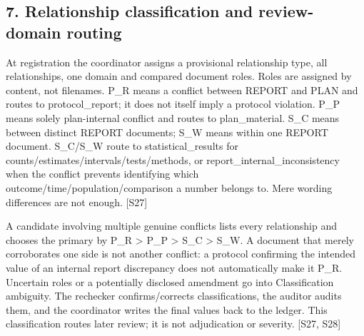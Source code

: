 \documentclass[10pt,a4paper]{article}
\begin{document}
\subsection*{7.\allowbreak{} Relationship classification and review-\allowbreak{}domain routing}
At registration the coordinator assigns a provisional relationship type, all relationships, one domain and compared document roles.\allowbreak{} Roles are assigned by content, not filenames.\allowbreak{} P\_\allowbreak{}R means a conflict between REPORT and PLAN and routes to protocol\_\allowbreak{}report; it does not itself imply a protocol violation.\allowbreak{} P\_\allowbreak{}P means solely plan-\allowbreak{}internal conflict and routes to plan\_\allowbreak{}material.\allowbreak{} S\_\allowbreak{}C means between distinct REPORT documents; S\_\allowbreak{}W means within one REPORT document.\allowbreak{} S\_\allowbreak{}C/\allowbreak{}S\_\allowbreak{}W route to statistical\_\allowbreak{}results for counts/\allowbreak{}estimates/\allowbreak{}intervals/\allowbreak{}tests/\allowbreak{}methods, or report\_\allowbreak{}internal\_\allowbreak{}inconsistency when the conflict prevents identifying which outcome/\allowbreak{}time/\allowbreak{}population/\allowbreak{}comparison a number belongs to.\allowbreak{} Mere wording differences are not enough.\allowbreak{} [S27]\par
A candidate involving multiple genuine conflicts lists every relationship and chooses the primary by P\_\allowbreak{}R > P\_\allowbreak{}P > S\_\allowbreak{}C > S\_\allowbreak{}W.\allowbreak{} A document that merely corroborates one side is not another conflict: a protocol confirming the intended value of an internal report discrepancy does not automatically make it P\_\allowbreak{}R.\allowbreak{} Uncertain roles or a potentially disclosed amendment go into Classification ambiguity.\allowbreak{} The rechecker confirms/\allowbreak{}corrects classifications, the auditor audits them, and the coordinator writes the final values back to the ledger.\allowbreak{} This classification routes later review; it is not adjudication or severity.\allowbreak{} [S27, S28]\par
\end{document}
